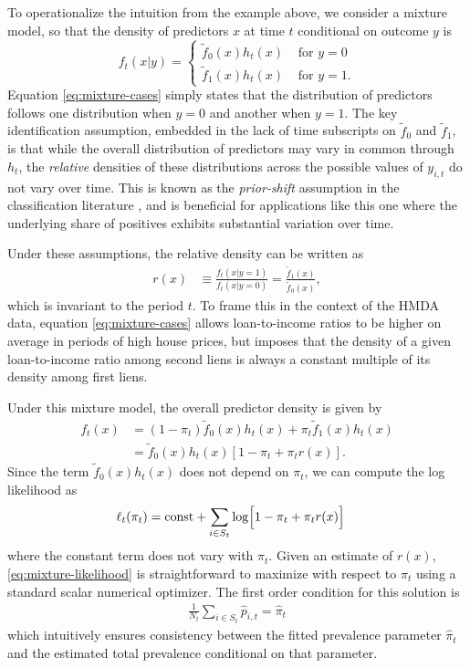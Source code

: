 \documentclass[letterpaper,12pt,usenames,dvipsnames]{article}
\newcommand{\sbrac}[1]{\left[ #1 \right]}
\newcommand{\Bigsbrac}[1]{\Bigl[ #1 \Bigr]}
\theoremstyle{definition}
\begin{document}
To operationalize the intuition from the example above, we consider a mixture model, so that the density of predictors $x$ at time $t$ conditional on outcome $y$ is
\begin{equation}
	\label{eq:mixture-cases}
	f_t(x | y) = \begin{cases}
		\tilde{f}_0(x) h_t(x) &\text{ for } y = 0 \\
		\tilde{f}_1(x) h_t(x) &\text{ for } y = 1.
	\end{cases}
\end{equation}
Equation \eqref{eq:mixture-cases} simply states that the distribution of predictors follows one distribution when $y = 0$ and another when $y = 1$. The key identification assumption, embedded in the lack of time subscripts on $\tilde{f}_0$ and $\tilde{f}_1$, is that while the overall distribution of predictors may vary in common through $h_t$, the \emph{relative} densities of these distributions across the possible values of $y_{i,t}$ do not vary over time. This is known as the \emph{prior-shift} assumption in the classification literature \citep{saerens2002adjusting,gonzalez2017review,lipton2018detecting}, and is beneficial for applications like this one where the underlying share of positives exhibits substantial variation over time.

Under these assumptions, the relative density can be written as
\begin{align}
	\label{eq:r-definition}
	r(x) &\equiv \frac{f_t(x | y = 1)}{f_t(x | y = 0)} = \frac{\tilde{f}_1(x)}{\tilde{f}_0(x)},
\end{align}
which is invariant to the period $t$.
To frame this in the context of the HMDA data, equation \eqref{eq:mixture-cases} allows loan-to-income ratios to be higher on average in periods of high house prices, but imposes that the density of a given loan-to-income ratio among second liens is always a constant multiple of its density among first liens.

Under this mixture model, the overall predictor density is given by
\begin{align*}
	f_t(x) &= (1 - \pi_t) \tilde{f}_0(x) h_t(x) + \pi_t \tilde{f}_1(x) h_t(x) \\
	&= \tilde{f}_0(x) h_t(x) \sbrac{1 - \pi_t + \pi_t r(x)}.
\end{align*}
Since the term $\tilde{f}_0(x) h_t(x)$ does not depend on $\pi_t$, we can compute the log likelihood as
\begin{align}
	\label{eq:mixture-likelihood}
	\ell_t(\pi_t) &= \text{const} + \sum_{i \in S_t} \log \Bigsbrac{1 - \pi_t + \pi_t r(x)}
\end{align}
where the constant term does not vary with $\pi_t$. Given an estimate of $r(x)$, \eqref{eq:mixture-likelihood} is straightforward to maximize with respect to $\pi_t$ using a standard scalar numerical optimizer. The first order condition for this solution is
\begin{align*}
	\frac{1}{N_t} \sum_{i \in S_t} \hat{p}_{i,t} = \hat{\pi}_t
\end{align*}
which intuitively ensures consistency between the fitted prevalence parameter $\hat{\pi}_t$ and the estimated total prevalence conditional on that parameter.
\end{document}
